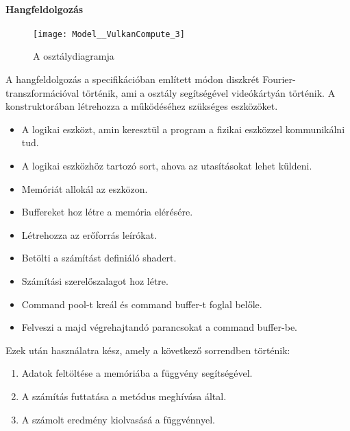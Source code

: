 \paragraph{Hangfeldolgoz\'as}
\begin{figure}[h]
	\texttt{[image: Model\_\_VulkanCompute\_3]}
	\centering
	\caption{A  oszt\'alydiagramja}
\end{figure}
A hangfeldolgoz\'as a specifik\'aci\'oban eml\'itett m\'odon diszkr\'et Fourier-transzform\'aci\'oval t\"ort\'enik, ami a  oszt\'aly seg\'its\'eg\'evel vide\'ok\'arty\'an t\"ort\'enik.
A konstruktor\'aban l\'etrehozza a m\H uk\"od\'es\'ehez sz\"uks\'eges eszk\"oz\"oket. 
\begin{itemize}
	\item A logikai eszk\"ozt, amin kereszt\"ul a program a fizikai eszk\"ozzel kommunik\'alni tud.
	\item A logikai eszk\"ozh\"oz tartoz\'o sort, ahova az utas\'it\'asokat lehet k\"uldeni.
	\item Mem\'ori\'at allok\'al az eszk\"ozon.
	\item Buffereket hoz l\'etre a mem\'oria el\'er\'es\'ere.
	\item L\'etrehozza az er\H oforr\'as le\'ir\'okat.
	\item Bet\"olti a sz\'am\'it\'ast defini\'al\'o shadert.
	\item Sz\'am\'it\'asi szerel\H oszalagot hoz l\'etre.
	\item Command pool-t kre\'al \'es command buffer-t foglal bel\H ole.
	\item Felveszi a majd v\'egrehajtand\'o parancsokat a command buffer-be.
\end{itemize}

Ezek ut\'an haszn\'alatra k\'esz, amely a k\"ovetkez\H o sorrendben t\"ort\'enik:
\begin{enumerate}
	\item Adatok felt\"olt\'ese a mem\'ori\'aba a  f\"uggv\'eny seg\'its\'eg\'evel.
	\item A sz\'am\'it\'as futtat\'asa a  met\'odus megh\'iv\'asa \'altal.
	\item A sz\'amolt eredm\'eny kiolvas\'as\'a a  f\"uggv\'ennyel.
\end{enumerate}

